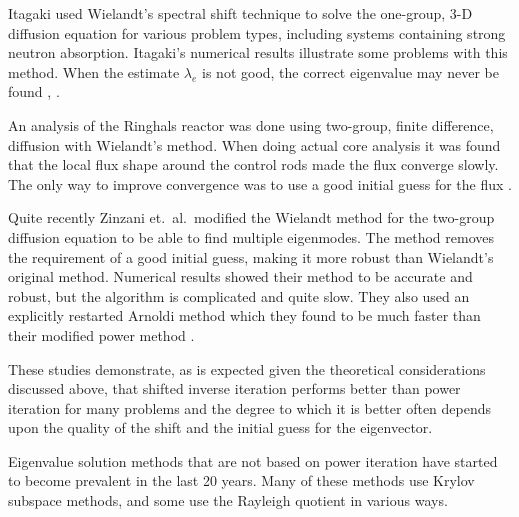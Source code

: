 Itagaki used Wielandt's spectral shift technique to solve the one-group, 3-D diffusion equation for various problem types, including systems containing strong neutron absorption. Itagaki's numerical results illustrate some problems with this method. When the estimate $\lambda_e$ is not good, the correct eigenvalue may never be found \cite{Itagaki1996}, \cite{Itagaki2002}. 

An analysis of the Ringhals reactor was done using two-group, finite difference, diffusion with Wielandt's method. When doing actual core analysis it was found that the local flux shape around the control rods made the flux converge slowly. The only way to improve convergence was to use a good initial guess for the flux \cite{Hotta1997}. 

Quite recently Zinzani et.\ al.\ modified the Wielandt method for the two-group diffusion equation to be able to find multiple eigenmodes. The method removes the requirement of a good initial guess, making it more robust than Wielandt's original method. %
%
Numerical results showed their method to be accurate and robust, but the algorithm is complicated and quite slow. They also used an explicitly restarted Arnoldi method which they found to be much faster than their modified power method \cite{Zinzani2008}.

These studies demonstrate, as is expected given the theoretical considerations discussed above, that shifted inverse iteration performs better than power iteration for many problems and the degree to which it is better often depends upon the quality of the shift and the initial guess for the eigenvector.

Eigenvalue solution methods that are not based on power iteration have started to become prevalent in the last 20 years. Many of these methods use Krylov subspace methods, and some use the Rayleigh quotient in various ways. 

